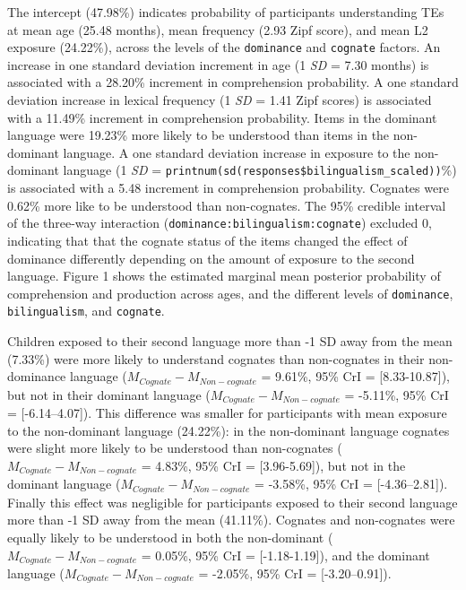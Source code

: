 \documentclass[
  english,
  man,man,floatsintext]{apa6}
\begin{document}
The intercept (47.98\%) indicates probability of participants understanding TEs at mean age (25.48 months), mean frequency (2.93 Zipf score), and mean L2 exposure (24.22\%), across the levels of the \texttt{dominance} and \texttt{cognate} factors. An increase in one standard deviation increment in age (1 \emph{SD} = 7.30 months) is associated with a 28.20\% increment in comprehension probability. A one standard deviation increase in lexical frequency (1 \emph{SD} = 1.41 Zipf scores) is associated with a 11.49\% increment in comprehension probability. Items in the dominant language were 19.23\% more likely to be understood than items in the non-dominant language. A one standard deviation increase in exposure to the non-dominant language (1 \emph{SD} = \texttt{printnum(sd(responses\$bilingualism\_scaled))}\%) is associated with a 5.48 increment in comprehension probability. Cognates were 0.62\% more like to be understood than non-cognates. The 95\% credible interval of the three-way interaction (\texttt{dominance:bilingualism:cognate}) excluded 0, indicating that that the cognate status of the items changed the effect of dominance differently depending on the amount of exposure to the second language. Figure 1 shows the estimated marginal mean posterior probability of comprehension and production across ages, and the different levels of \texttt{dominance}, \texttt{bilingualism}, and \texttt{cognate}.

Children exposed to their second language more than -1 SD away from the mean (7.33\%) were more likely to understand cognates than non-cognates in their non-dominance language (\(M_{Cognate}-M_{Non-cognate}\) = 9.61\%, 95\% CrI = {[}8.33-10.87{]}), but not in their dominant language (\(M_{Cognate}-M_{Non-cognate}\) = -5.11\%, 95\% CrI = {[}-6.14--4.07{]}). This difference was smaller for participants with mean exposure to the non-dominant language (24.22\%): in the non-dominant language cognates were slight more likely to be understood than non-cognates (\(M_{Cognate}-M_{Non-cognate}\) = 4.83\%, 95\% CrI = {[}3.96-5.69{]}), but not in the dominant language (\(M_{Cognate}-M_{Non-cognate}\) = -3.58\%, 95\% CrI = {[}-4.36--2.81{]}). Finally this effect was negligible for participants exposed to their second language more than -1 SD away from the mean (41.11\%). Cognates and non-cognates were equally likely to be understood in both the non-dominant (\(M_{Cognate}-M_{Non-cognate}\) = 0.05\%, 95\% CrI = {[}-1.18-1.19{]}), and the dominant language (\(M_{Cognate}-M_{Non-cognate}\) = -2.05\%, 95\% CrI = {[}-3.20--0.91{]}).
\end{document}
